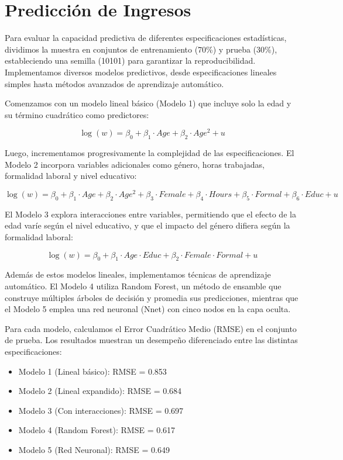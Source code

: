 \documentclass[12pt,a4paper,onecolumn]{article}
\begin{document}
\section{Predicción de Ingresos}

Para evaluar la capacidad predictiva de diferentes especificaciones estadísticas, dividimos la muestra en conjuntos de entrenamiento (70\%) y prueba (30\%), estableciendo una semilla (10101) para garantizar la reproducibilidad. Implementamos diversos modelos predictivos, desde especificaciones lineales simples hasta métodos avanzados de aprendizaje automático.

Comenzamos con un modelo lineal básico (Modelo 1) que incluye solo la edad y su término cuadrático como predictores:

$$ \log(w) = \beta_0 + \beta_1 \cdot Age + \beta_2 \cdot Age^2 + u $$

Luego, incrementamos progresivamente la complejidad de las especificaciones. El Modelo 2 incorpora variables adicionales como género, horas trabajadas, formalidad laboral y nivel educativo:

$$ \log(w) = \beta_0 + \beta_1 \cdot Age + \beta_2 \cdot Age^2 + \beta_3 \cdot Female + \beta_4 \cdot Hours + \beta_5 \cdot Formal + \beta_6 \cdot Educ + u $$

El Modelo 3 explora interacciones entre variables, permitiendo que el efecto de la edad varíe según el nivel educativo, y que el impacto del género difiera según la formalidad laboral:

$$ \log(w) = \beta_0 + \beta_1 \cdot Age \cdot Educ + \beta_2 \cdot Female \cdot Formal + u $$

Además de estos modelos lineales, implementamos técnicas de aprendizaje automático. El Modelo 4 utiliza Random Forest, un método de ensamble que construye múltiples árboles de decisión y promedia sus predicciones, mientras que el Modelo 5 emplea una red neuronal (Nnet) con cinco nodos en la capa oculta.

Para cada modelo, calculamos el Error Cuadrático Medio (RMSE) en el conjunto de prueba. Los resultados muestran un desempeño diferenciado entre las distintas especificaciones:

\begin{itemize}
    \item Modelo 1 (Lineal básico): RMSE = 0.853
    \item Modelo 2 (Lineal expandido): RMSE = 0.684
    \item Modelo 3 (Con interacciones): RMSE = 0.697
    \item Modelo 4 (Random Forest): RMSE = 0.617
    \item Modelo 5 (Red Neuronal): RMSE = 0.649
\end{itemize}
\end{document}

